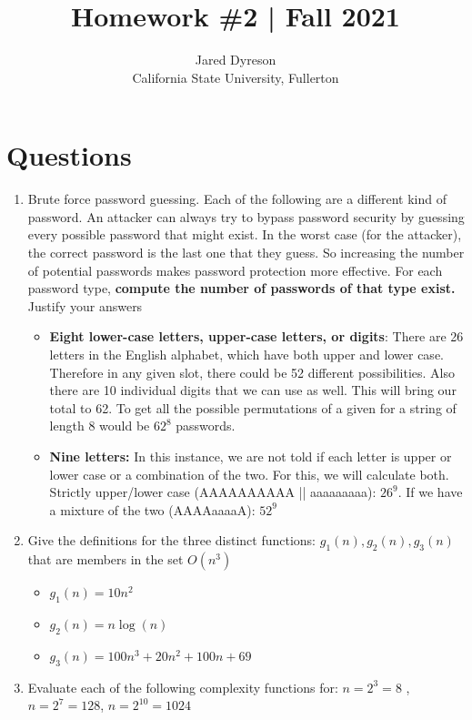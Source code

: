 \documentclass{article}
\title{Homework \#2 | Fall 2021}
\author{Jared Dyreson\\ 
        California State University, Fullerton}
\begin{document}
\maketitle
\tableofcontents

\newpage


\section{Questions}

\begin{enumerate}

\item Brute force password guessing. Each of the following are a different kind of password. An attacker can always try to bypass password security by guessing every possible password that might exist. In the worst case  (for the attacker), the correct password is the last one that they guess. So increasing the number of potential passwords makes password protection more effective. For each password type, \textbf{compute the number of passwords of that type exist.} Justify your answers

\begin{itemize}
\item \textbf{Eight lower-case letters, upper-case letters, or digits}: There are 26 letters in the English alphabet, which have both upper and lower case. Therefore in any given slot, there could be 52 different possibilities. Also there are 10 individual digits that we can use as well. This will bring our total to 62. To get all the possible permutations of a given for a string of length 8 would be $62^{8}$ passwords.
\item \textbf{Nine letters:} In this instance, we are not told if each letter is upper or lower case or a combination of the two. For this, we will calculate both. Strictly upper/lower case (AAAAAAAAAA || aaaaaaaaa): $26^{9}$. If we have a mixture of the two (AAAAaaaaA): $52^{9}$
\end{itemize}
\item Give the definitions for the three distinct functions: $g_{1}(n), g_{2}(n), g_{3}(n)$ that are members in the set $O(n^{3})$

\begin{itemize}
\item $g_{1}(n) = 10n^{2}$
\item $g_{2}(n) = n\log(n)$
\item $g_{3}(n) = 100n^{3} + 20n^{2} + 100n + 69$
\end{itemize}
\item Evaluate each of the following complexity functions for: $n = 2^{3} = 8$ , $n = 2^{7} = 128$, $n = 2^{10} = 1024$


\end{enumerate}
\end{document}
